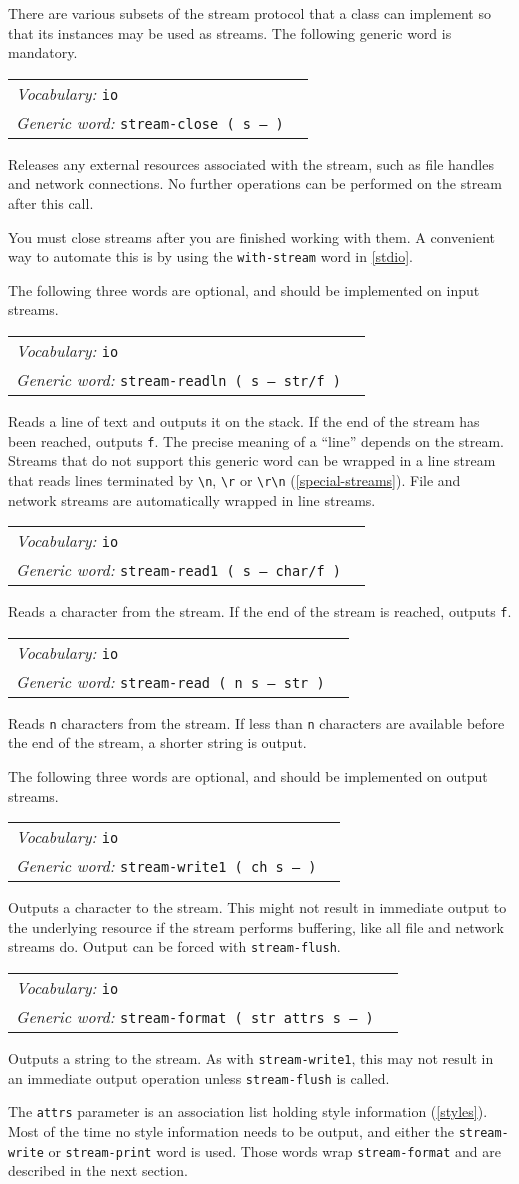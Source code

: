 \documentclass{book}
\newcommand{\vocabulary}[1]{\emph{Vocabulary:} \texttt{#1}&\\}
\newcommand{\genericword}[2]{\index{\texttt{#1}}\emph{Generic word:} \texttt{#2}&\\}
\newcommand{\wordtable}[1]{


\begin{tabularx}{12cm}{lX}
\hline
#1
\hline
\end{tabularx}

}
\begin{document}
There are various subsets of the stream protocol that a class can implement so that its instances may be used as streams. The following generic word is mandatory.

\wordtable{
\vocabulary{io}
\genericword{stream-close}{stream-close ( s -- )}
}
Releases any external resources associated with the stream, such as file handles and network connections. No further operations can be performed on the stream after this call.

You must close streams after you are finished working with them. A convenient way to automate this is by using the \texttt{with-stream} word in \ref{stdio}.

The following three words are optional, and should be implemented on input streams.
\wordtable{
\vocabulary{io}
\genericword{stream-readln}{stream-readln ( s -- str/f )}
}
Reads a line of text and outputs it on the stack. If the end of the stream has been reached, outputs \texttt{f}. The precise meaning of a ``line'' depends on the stream. Streams that do not support this generic word can be wrapped in a line stream that reads lines terminated by \verb|\n|, \verb|\r| or \verb|\r\n| (\ref{special-streams}). File and network streams are automatically wrapped in line streams.
\wordtable{
\vocabulary{io}
\genericword{stream-read1}{stream-read1 ( s -- char/f )}
}
Reads a character from the stream. If the end of the stream is reached, outputs \verb|f|.

\wordtable{
\vocabulary{io}
\genericword{stream-read}{stream-read ( n s -- str )}
}
Reads \texttt{n} characters from the stream. If less than \texttt{n} characters are available before the end of the stream, a shorter string is output.

The following three words are optional, and should be implemented on output streams.

\wordtable{
\vocabulary{io}
\genericword{stream-write1}{stream-write1 ( ch s -- )}
}
Outputs a character to the stream. This might not result in immediate output to the underlying resource if the stream performs buffering, like all file and network streams do. Output can be forced with \verb|stream-flush|.

\wordtable{
\vocabulary{io}
\genericword{stream-format}{stream-format ( str attrs s -- )}
}
Outputs a string to the stream. As with \verb|stream-write1|, this may not result in an immediate output operation unless \verb|stream-flush| is called.

The \texttt{attrs} parameter is an association list holding style information (\ref{styles}). Most of the time no style information needs to be output, and either the \texttt{stream-write} or \texttt{stream-print} word is used. Those words wrap \verb|stream-format| and are described in the next section.
\end{document}
